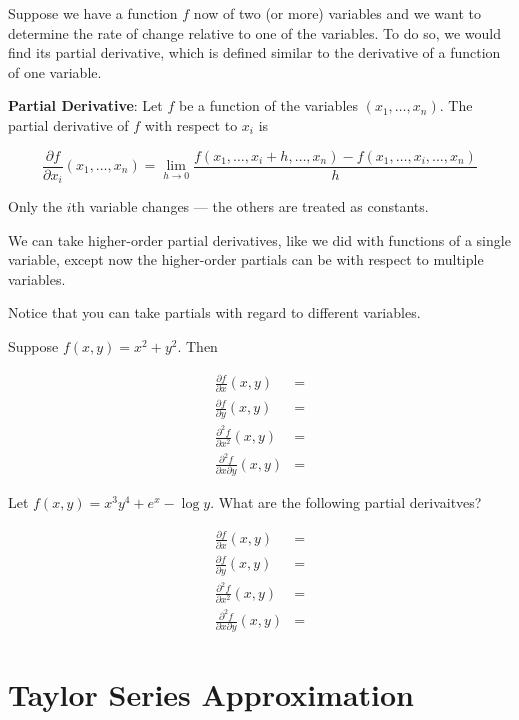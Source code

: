 \documentclass[]{book}
\theoremstyle{definition}
\theoremstyle{definition}
\theoremstyle{definition}
\theoremstyle{remark}
\let\BeginKnitrBlock\begin \let\EndKnitrBlock\end
\begin{document}
Suppose we have a function \(f\) now of two (or more) variables and we want to determine the rate of change relative to one of the variables. To do so, we would find its partial derivative, which is defined similar to the derivative of a function of one variable.

\textbf{Partial Derivative}: Let \(f\) be a function of the variables \((x_1,\ldots,x_n)\). The partial derivative of \(f\) with respect to \(x_i\) is

\[\frac{\partial f}{\partial x_i} (x_1,\ldots,x_n) = \lim\limits_{h\to 0} \frac{f(x_1,\ldots,x_i+h,\ldots,x_n)-f(x_1,\ldots,x_i,\ldots,x_n)}{h}\]

Only the \(i\)th variable changes --- the others are treated as constants.

We can take higher-order partial derivatives, like we did with functions of a single variable, except now the higher-order partials can be with respect to multiple variables.

\BeginKnitrBlock{example}[More than one type of partial]
\protect\hypertarget{exm:unnamed-chunk-18}{}{\label{exm:unnamed-chunk-18} {} }Notice that you can take partials with regard to different variables.

Suppose \(f(x,y)=x^2+y^2\). Then

\begin{align*}
\frac{\partial f}{\partial x}(x,y) &=\\
\frac{\partial f}{\partial y}(x,y) &=\\
\frac{\partial^2 f}{\partial x^2}(x,y) &=\\
\frac{\partial^2 f}{\partial x \partial y}(x,y) &=
\end{align*}
\EndKnitrBlock{example}

\BeginKnitrBlock{exercise}
\protect\hypertarget{exr:unnamed-chunk-19}{}{\label{exr:unnamed-chunk-19} }Let \(f(x,y)=x^3 y^4 +e^x -\log y\). What are the following partial derivaitves?

\begin{align*}
\frac{\partial f}{\partial x}(x,y) &=\\
\frac{\partial f}{\partial y}(x,y) &=\\
\frac{\partial^2 f}{\partial x^2}(x,y) &=\\
\frac{\partial^2 f}{\partial x \partial y}(x,y) &= 
\end{align*}
\EndKnitrBlock{exercise}

\hypertarget{taylorapprox}{%
\section{Taylor Series Approximation}\label{taylorapprox}}
\end{document}
